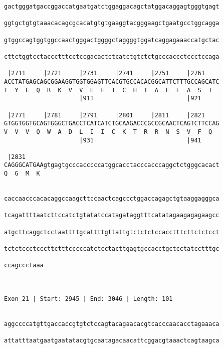 \documentclass{article}
\begin{document}
\begin{Verbatim}
gactgggatgaccggaccatgaatgatctggaggacagctatggacaggagtgggtgagt
                                                            
ggtgctgtgtaaacacagcgcacatgtgtgaaggtacgggaagctgaatgcctggcagga
                                                            
gtggccagtggtggccaactgggactggggctaggggtggatcaggagaaaccatgctac
                                                            
cttctggtcctaccctttcctccgacactctcatctgtctctgcccaccctccctccaga
                                                            
 |2711     |2721     |2731     |2741     |2751     |2761    
ACCTATGAGCAGCGGAAGGTGGTGGAGTTCACGTGCCACACGGCATTCTTTGCCAGCATC
T  Y  E  Q  R  K  V  V  E  F  T  C  H  T  A  F  F  A  S  I  
                     |911                          |921     
  
 |2771     |2781     |2791     |2801     |2811     |2821    
GTGGTGGTGCAGTGGGCTGACCTCATCATCTGCAAGACCCGCCGCAACTCAGTCTTCCAG
V  V  V  Q  W  A  D  L  I  I  C  K  T  R  R  N  S  V  F  Q  
                     |931                          |941     
  
 |2831                                                      
CAGGGCATGAAgtgagtgcccacccccatggcacctacccacccaggctctgggcacact
Q  G  M  K                                                  
                                                            
  
caccaacccacacaggccaagcttccaactcagccctggaccagagctgtaaggagggca
                                                            
tcagattttaatcttccatctgtatatccatagataggtttcatatagaagagagaagcc
                                                            
atgcttcaggctcctaattttgcattttgttattgtctctctccacctttcttctctcct
                                                            
tctctccctcccttctttcccccatctcctacttgagtgccacctgctcctatcctttgc
                                                            
ccagccctaaa
           
           
 
Exon 21 | Start: 2945 | End: 3046 | Length: 101


aggccccatgttgaccaccgtgtctccagtacagaacacgtcacccaacacctagaaaca
                                                            
attatttaatgaatgaatatacgtgcaatagacaacattcggacgtaaactcagtaagca
                                                            

\end{Verbatim}
\end{document}

